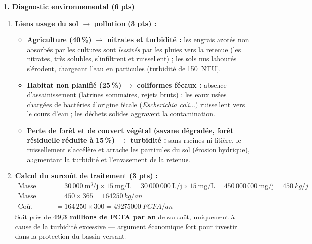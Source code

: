 \documentclass[11pt]{article}
\begin{document}
\begin{corrige}
\textbf{1. Diagnostic environnemental (6 pts)}
\begin{enumerate}
\item \textbf{Liens usage du sol $\to$ pollution (3 pts) :}
\begin{itemize}
\item \textbf{Agriculture (40\,\%) $\to$ nitrates et turbidité :} les engrais azotés non absorbés par les cultures sont \emph{lessivés} par les pluies vers la retenue (les nitrates, très solubles, s'infiltrent et ruissellent) ; les sols nus labourés s'érodent, chargeant l'eau en particules (turbidité de \SI{150}{NTU}).
\item \textbf{Habitat non planifié (25\,\%) $\to$ coliformes fécaux :} absence d'assainissement (latrines sommaires, rejets bruts) : les eaux usées chargées de bactéries d'origine fécale (\emph{Escherichia coli}...) ruissellent vers le cours d'eau ; les déchets solides aggravent la contamination.
\item \textbf{Perte de forêt et de couvert végétal (savane dégradée, forêt résiduelle réduite à 15\,\%) $\to$ turbidité :} sans racines ni litière, le ruissellement s'accélère et arrache les particules du sol (érosion hydrique), augmentant la turbidité et l'envasement de la retenue.
\end{itemize}
\item \textbf{Calcul du surcoût de traitement (3 pts) :}
\begin{align*}
\text{Masse journalière} &= 30\,000\ \text{m}^3/\text{j} \times 15\ \text{mg/L} = 30\,000\,000\ \text{L/j} \times 15\ \text{mg/L} = 450\,000\,000\ \text{mg/j} = \SI{450}{kg/j} \\
\text{Masse annuelle} &= 450 \times 365 = \SI{164 250}{kg/an} \\
\text{Coût annuel} &= 164\,250 \times 300 = \SI{49 275 000}{FCFA/an}
\end{align*}
Soit près de \textbf{49,3 millions de FCFA par an} de surcoût, uniquement à cause de la turbidité excessive — argument économique fort pour investir dans la protection du bassin versant.
\end{enumerate}


\end{corrige}
\end{document}
